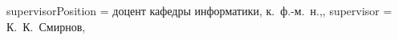 {	%
	supervisorPosition = {доцент кафедры информатики, к.~ф.-м.~н.,}, %
	supervisor         = {К.~К.~Смирнов},
}
